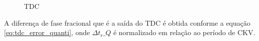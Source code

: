



\begin{figure}[htb]
	\caption{TDC }
	\begin{center}
		\hfil
	\end{center}
	\label{fig:tdc_harware}
\end{figure}


A diferença de fase fracional que é a saída do TDC é obtida conforme a equação \ref{eq:tdc_error_quanti}, onde $\Delta t_r\_Q$ é normalizado em relação ao período de CKV.

